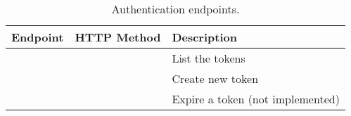 \begin{table}[htpb]
    \centering
    \begin{tabu} to \textwidth {lX[c]l}
        Endpoint                         & HTTP Method & Description                                     \\
        \midrule
                        &          & List the tokens                          \\
                        &         & Create new token                         \\
                   &       & Expire a token (not implemented)         \\
    \end{tabu}
    \caption{Authentication endpoints.}
    \label{tab:rest_auth}
\end{table}
